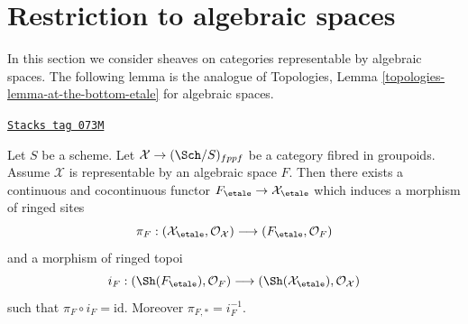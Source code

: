 \section{Restriction to algebraic spaces}
\label{stacks-sheaves-section-restriction-algebraic-spaces}
In this section we consider sheaves on categories representable by
algebraic spaces. The following lemma is the analogue of
Topologies, Lemma \ref{topologies-lemma-at-the-bottom-etale}
for algebraic spaces.

\begin{lemma}[Compare]
\label{stacks-sheaves-lemma-compare}
\href{https://stacks.math.columbia.edu/tag/073M}{\texttt{Stacks tag 073M}}

Let $S$ be a scheme. Let $\mathcal{X} \to (\Sch/S)_{fppf}$ be a category
fibred in groupoids. Assume $\mathcal{X}$ is representable by an algebraic
space $F$. Then there exists a continuous and cocontinuous functor
$
F_\etale \to \mathcal{X}_\etale
$
which induces a morphism of ringed sites
$$
\pi_F :
(\mathcal{X}_\etale, \mathcal{O}_\mathcal{X})
\longrightarrow
(F_\etale, \mathcal{O}_F)
$$
and a morphism of ringed topoi
$$
i_F :
(\Sh(F_\etale), \mathcal{O}_F)
\longrightarrow
(\Sh(\mathcal{X}_\etale), \mathcal{O}_\mathcal{X})
$$
such that $\pi_F \circ i_F = \text{id}$. Moreover $\pi_{F, *} = i_F^{-1}$.
\end{lemma}

